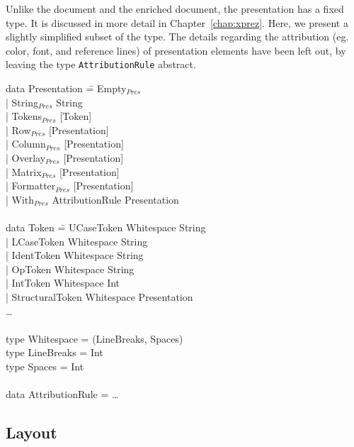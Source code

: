 Unlike the document and the enriched document, the presentation has a fixed type. It is discussed in more detail in Chapter~\ref{chap:xprez}. Here, we present a slightly simplified subset of the type. The details regarding the attribution (eg. color, font, and reference lines) of presentation elements have been left out, by leaving the type \verb|AttributionRule| abstract. 

\noindent
\ttfamily
\begin{tabbing}
data Presentation \= = Empty$_{Pres}$\\
                  \> | String$_{Pres}$ String \\
                  \> | Tokens$_{Pres}$ [Token]\\
                  \> | Row$_{Pres}$ [Presentation]\\
                  \> | Column$_{Pres}$ [Presentation]\\
                  \> | Overlay$_{Pres}$ [Presentation]\\
                  \> | Matrix$_{Pres}$ [Presentation]\\
                  \> | Formatter$_{Pres}$ [Presentation]\\
                  \> | With$_{Pres}$ AttributionRule Presentation\\
\\
data Token \= = UCaseToken Whitespace String\\
           \> | LCaseToken Whitespace String\\
           \> | IdentToken Whitespace String\\
           \> | OpToken Whitespace String\\
           \> | IntToken Whitespace Int\\
           \> | StructuralToken Whitespace Presentation\\
           \> \dots \\
\\
type Whitespace = (LineBreaks, Spaces)\\
type LineBreaks = Int\\
type Spaces = Int\\
\\
data AttributionRule = \dots\\
\end{tabbing}
\rmfamily
{}  

\subsection{Layout}

